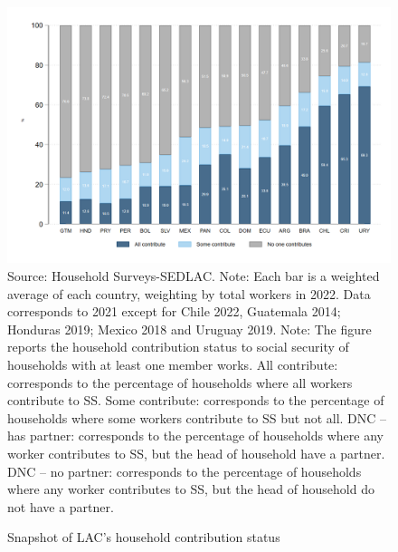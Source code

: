 \documentclass[english]{article}
\begin{document}
\begin{itemize}
\begin{figure}[!htb]
    \justifying
     \caption{Snapshot of LAC’s household contribution status}     \includegraphics[scale=.3]{latex/figures/Household/snapshot_household.png}
    \label{fig:Householdlastyear}
    \footnotesize{Source: Household Surveys-SEDLAC.}
    \footnotesize{Note: Each bar is a weighted average of each country, weighting by total workers in 2022. Data corresponds to 2021 except for Chile 2022, Guatemala 2014; Honduras 2019; Mexico 2018 and Uruguay 2019.}
    \footnotesize{Note: The figure reports the household contribution status to social security of households with at least one member works.   All contribute: corresponds to the percentage of households where all workers contribute to SS. Some contribute: corresponds to the percentage of households where some workers contribute to SS but not all. DNC – has partner: corresponds to the percentage of households where any worker contributes to SS, but the head of household have a partner. DNC – no partner: corresponds to the percentage of households where any worker contributes to SS, but the head of household do not have a partner.}
\end{figure}


\end{itemize}
\end{document}
